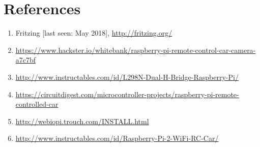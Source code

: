 \documentclass[a4paper,11pt]{article}
\begin{document}
\section{References}
\begin{enumerate}  
\item Fritzing [last seen: May 2018], \url{http://fritzing.org/}
\item \url{https://www.hackster.io/whitebank/raspberry-pi-remote-control-car-camera-a7c7bf}
\item \url{http://www.instructables.com/id/L298N-Dual-H-Bridge-Raspberry-Pi/}
\item \url{https://circuitdigest.com/microcontroller-projects/raspberry-pi-remote-controlled-car}
\item \url{http://webiopi.trouch.com/INSTALL.html}
\item \url{http://www.instructables.com/id/Raspberry-Pi-2-WiFi-RC-Car/}
\end{enumerate}
\end{document}
